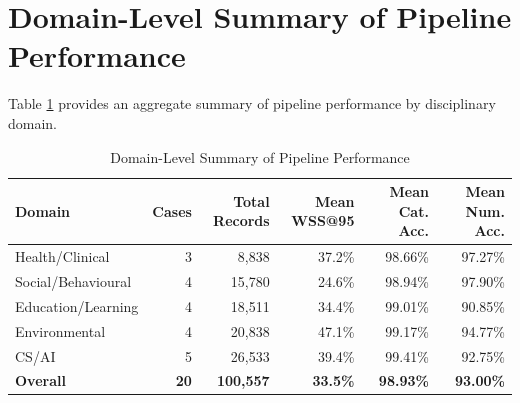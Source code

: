 \documentclass[12pt]{article}
\begin{document}
\section{Domain-Level Summary of Pipeline Performance}
\label{app:domain}

Table \ref{tab:domain_summary} provides an aggregate summary of pipeline performance by disciplinary domain.

\begin{table}[H]
\centering
\caption{Domain-Level Summary of Pipeline Performance}
\label{tab:domain_summary}
\begin{tabular}{lrrrrr}
\toprule
\textbf{Domain} & \textbf{Cases} & \textbf{Total Records} & \textbf{Mean WSS@95} & \textbf{Mean Cat. Acc.} & \textbf{Mean Num. Acc.} \\
\midrule
Health/Clinical & 3 & 8,838 & 37.2\% & 98.66\% & 97.27\% \\
Social/Behavioural & 4 & 15,780 & 24.6\% & 98.94\% & 97.90\% \\
Education/Learning & 4 & 18,511 & 34.4\% & 99.01\% & 90.85\% \\
Environmental & 4 & 20,838 & 47.1\% & 99.17\% & 94.77\% \\
CS/AI & 5 & 26,533 & 39.4\% & 99.41\% & 92.75\% \\
\midrule
\textbf{Overall} & \textbf{20} & \textbf{100,557} & \textbf{33.5\%} & \textbf{98.93\%} & \textbf{93.00\%} \\
\bottomrule
\end{tabular}
\end{table}
\end{document}
